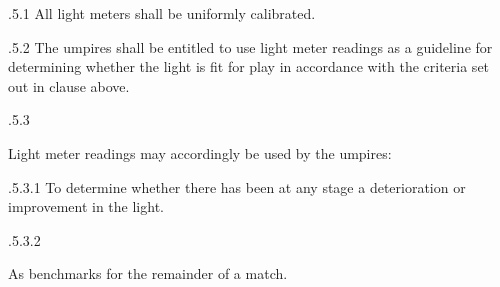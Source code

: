 \documentclass[12pt]{article}
\begin{document}
\vspace{\baselineskip}
\begin{adjustwidth}{0.49in}{0.0in}
{\fontsize{9pt}{10.8pt}.5.1 \tabto{1.17in} All light meters shall be uniformly calibrated.\par}\par

\end{adjustwidth}


\vspace{\baselineskip}
\begin{adjustwidth}{1.18in}{0.06in}
{\fontsize{9pt}{10.8pt}.5.2 \tabto{1.17in} The umpires shall be entitled to use light meter readings as a guideline for determining whether the light is fit for play in accordance with the criteria set out in clause above.\par}\par

\end{adjustwidth}


\vspace{\baselineskip}
\begin{adjustwidth}{0.49in}{0.0in}
{\fontsize{9pt}{10.8pt}.5.3 \tabto{1.17in} {\fontsize{8pt}{9.6pt}\selectfont Light meter readings may accordingly be used by the umpires:\par}\par}\par

\end{adjustwidth}


\vspace{\baselineskip}
\begin{adjustwidth}{1.97in}{0.75in}
{\fontsize{9pt}{10.8pt}.5.3.1 \tabto{1.96in} To determine whether there has been at any stage a deterioration or improvement in the light.\par}\par

\end{adjustwidth}


\vspace{\baselineskip}
\begin{adjustwidth}{1.18in}{0.0in}
{\fontsize{9pt}{10.8pt}.5.3.2 \tabto{1.96in} {\fontsize{8pt}{9.6pt}\selectfont As benchmarks for the remainder of a match.\par}\par}\par

\end{adjustwidth}
\end{document}
